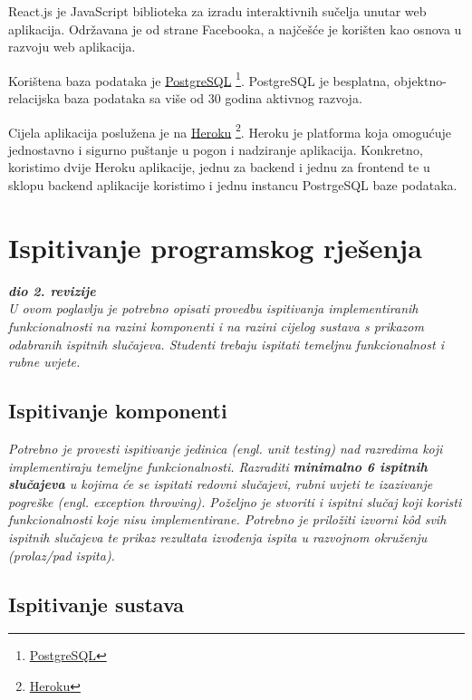             React.js je JavaScript biblioteka za izradu interaktivnih sučelja unutar web aplikacija. Održavana je od strane Facebooka, a najčešće je korišten kao osnova u razvoju web aplikacija.
            
            Korištena baza podataka je \underline{PostgreSQL} \footnote{\href{https://www.postgresql.org/}{PostgreSQL}}. PostgreSQL je besplatna, objektno-relacijska baza podataka sa više od 30 godina aktivnog razvoja.
            
            Cijela aplikacija poslužena je na \underline{Heroku} \footnote{\href{https://www.heroku.com/home}{Heroku}}. Heroku je platforma koja omogućuje jednostavno i sigurno puštanje  u pogon i nadziranje aplikacija. Konkretno, koristimo dvije Heroku aplikacije, jednu za backend i jednu za frontend te u sklopu backend aplikacije koristimo i jednu instancu PostrgeSQL baze podataka.
			
			\eject 
		
	
		\section{Ispitivanje programskog rješenja}
			
			\textbf{\textit{dio 2. revizije}}\\
			
			 \textit{U ovom poglavlju je potrebno opisati provedbu ispitivanja implementiranih funkcionalnosti na razini komponenti i na razini cijelog sustava s prikazom odabranih ispitnih slučajeva. Studenti trebaju ispitati temeljnu funkcionalnost i rubne uvjete.}
	
			
			\subsection{Ispitivanje komponenti}
			\textit{Potrebno je provesti ispitivanje jedinica (engl. unit testing) nad razredima koji implementiraju temeljne funkcionalnosti. Razraditi \textbf{minimalno 6 ispitnih slučajeva} u kojima će se ispitati redovni slučajevi, rubni uvjeti te izazivanje pogreške (engl. exception throwing). Poželjno je stvoriti i ispitni slučaj koji koristi funkcionalnosti koje nisu implementirane. Potrebno je priložiti izvorni kôd svih ispitnih slučajeva te prikaz rezultata izvođenja ispita u razvojnom okruženju (prolaz/pad ispita). }
			
			
			
			\subsection{Ispitivanje sustava}
			
